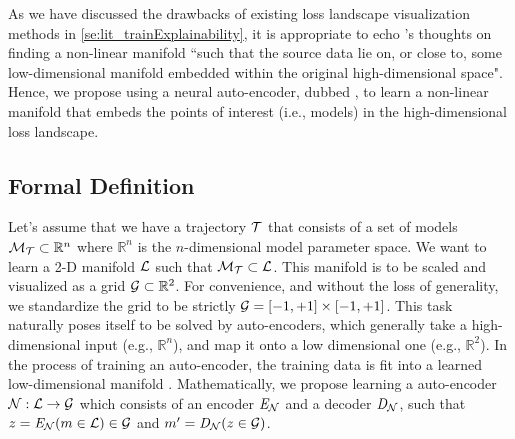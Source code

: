 \documentclass[letterpaper]{article} %
\begin{document}
            As we have discussed the drawbacks of existing loss landscape visualization methods in \cref{se:lit_trainExplainability}, it is appropriate to echo \cite{PhysRevX.11.041026}'s thoughts on finding a non-linear manifold ``such that the source data lie on, or close to, some low-dimensional manifold embedded within the original high-dimensional space". Hence, we propose using a neural auto-encoder, dubbed \proposedautencoder{}, to learn a non-linear manifold that embeds the points of interest (i.e., models) in the high-dimensional loss landscape.


            \subsection{Formal Definition}
            
            Let's assume that we have a trajectory $\mathcal{T}$ that consists of a set of models $\mathcal{M_T} \subset \mathbb{R}^n$ where $\mathbb{R}^n$ is the $n$-dimensional model parameter space. We want to learn a 2-D manifold $\mathcal{L}$ such that $\mathcal{M_T} \subset \mathcal{L}$. This manifold is to be scaled and visualized as a grid $\mathcal{G} \subset \mathbb{R}^2$. For convenience, and without the loss of generality, we standardize the grid to be strictly $\mathcal{G} = [-1, +1]\times [-1, +1] $. 
            This task naturally poses itself to be solved by auto-encoders, which generally take a high-dimensional input (e.g., $\mathbb{R}^n$), and map it onto a low dimensional one (e.g., $\mathbb{R}^2$). In the process of training an auto-encoder, the training data is fit into a learned low-dimensional manifold 
            \cite{bengio2009learning}. Mathematically, we propose learning a \proposedautencoder{} auto-encoder $\mathcal{N} : \mathcal{L} \to \mathcal{G}$ which consists of an encoder $\mathit{E}_{\mathcal{N}}$ and a decoder $\mathit{D}_{\mathcal{N}}$, such that  $z = \mathit{E}_{\mathcal{N}} (m \in \mathcal{L}) \in \mathcal{G}$ and $m^\prime = \mathit{D}_{\mathcal{N}} (z \in \mathcal{G}) $.
\end{document}
